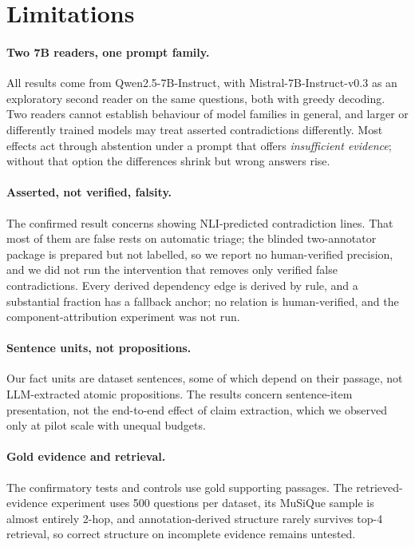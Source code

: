 \section*{Limitations}
\label{sec:limitations}

\paragraph{Two 7B readers, one prompt family.} All results come from Qwen2.5-7B-Instruct, with Mistral-7B-Instruct-v0.3 as an exploratory second reader on the same questions, both with greedy decoding. Two readers cannot establish behaviour of model families in general, and larger or differently trained models may treat asserted contradictions differently. Most effects act through abstention under a prompt that offers \emph{insufficient evidence}; without that option the differences shrink but wrong answers rise.

\paragraph{Asserted, not verified, falsity.} The confirmed result concerns showing NLI-predicted contradiction lines. That most of them are false rests on automatic triage; the blinded two-annotator package is prepared but not labelled, so we report no human-verified precision, and we did not run the intervention that removes only verified false contradictions. Every derived dependency edge is derived by rule, and a substantial fraction has a fallback anchor; no relation is human-verified, and the component-attribution experiment was not run.

\paragraph{Sentence units, not propositions.} Our fact units are dataset sentences, some of which depend on their passage, not LLM-extracted atomic propositions. The results concern sentence-item presentation, not the end-to-end effect of claim extraction, which we observed only at pilot scale with unequal budgets.

\paragraph{Gold evidence and retrieval.} The confirmatory tests and controls use gold supporting passages. The retrieved-evidence experiment uses 500 questions per dataset, its MuSiQue sample is almost entirely 2-hop, and annotation-derived structure rarely survives top-4 retrieval, so correct structure on incomplete evidence remains untested.

